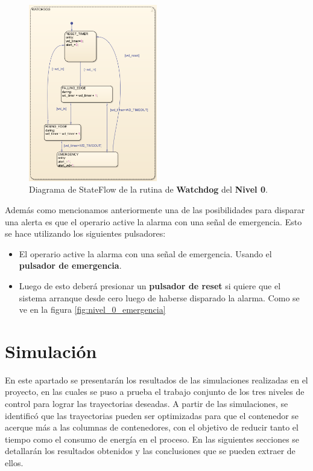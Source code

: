 \documentclass[11pt]{article}
\begin{document}
\begin{figure}[!h]
	\centering
	\includegraphics[width=0.5\textwidth]{images/imagen_28_watchdog.png}
	\caption{Diagrama de StateFlow de la rutina de \textbf{Watchdog} del \textbf{Nivel 0}.}
	\label{fig:nivel_0_watchdog}
\end{figure}

\newpage

Además como mencionamos anteriormente una de las posibilidades para disparar una alerta es que el operario active la alarma con una señal de emergencia. Esto se hace utilizando los siguientes pulsadores:
\begin{itemize}
	\item El operario active la alarma con una señal de emergencia. Usando el \textbf{pulsador de emergencia}.
	\item Luego de esto deberá presionar un \textbf{pulsador de reset} si quiere que el sistema arranque desde cero luego de haberse disparado la alarma. Como se ve en la figura \ref{fig:nivel_0_emergencia}
\end{itemize}

\section{Simulación}
En este apartado se presentarán los resultados de las simulaciones realizadas en el proyecto, en las cuales se puso a prueba el trabajo conjunto de los tres niveles de control para lograr las trayectorias deseadas. A partir de las simulaciones, se identificó que las trayectorias pueden ser optimizadas para que el contenedor se acerque más a las columnas de contenedores, con el objetivo de reducir tanto el tiempo como el consumo de energía en el proceso. En las siguientes secciones se detallarán los resultados obtenidos y las conclusiones que se pueden extraer de ellos.
\end{document}
